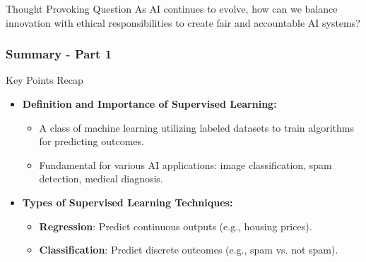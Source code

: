 \documentclass[aspectratio=169]{beamer}
\begin{document}
\begin{frame}[fragile]{Thought Provoking Question}
    As AI continues to evolve, how can we balance innovation with ethical responsibilities to create fair and accountable AI systems?
\end{frame}

\begin{frame}[fragile]
    \frametitle{Summary - Part 1}
    \begin{block}{Key Points Recap}
        \begin{itemize}
            \item \textbf{Definition and Importance of Supervised Learning:}
            \begin{itemize}
                \item A class of machine learning utilizing labeled datasets to train algorithms for predicting outcomes. 
                \item Fundamental for various AI applications: image classification, spam detection, medical diagnosis.
            \end{itemize}

            \item \textbf{Types of Supervised Learning Techniques:}
            \begin{itemize}
                \item \textbf{Regression}: Predict continuous outputs (e.g., housing prices).
                \item \textbf{Classification}: Predict discrete outcomes (e.g., spam vs. not spam).
            \end{itemize}
        \end{itemize}
    \end{block}
\end{frame}
\end{document}
